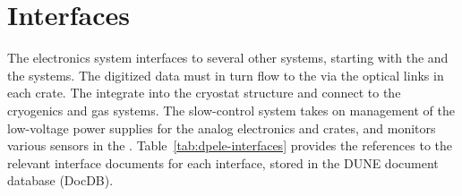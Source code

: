 

\section{Interfaces}
\label{sec:fddp-tpc-elec-intfc}


The \dual electronics system interfaces to several other systems, starting with the  and the  systems.  The digitized data must in turn %
flow to the  via the optical links in each  crate. The  integrate into the cryostat structure and connect to the cryogenics and gas systems. The slow-control system takes on management of the low-voltage power supplies for the  analog electronics and  crates, and  monitors various sensors in the . %
Table~\ref{tab:dpele-interfaces} provides the references to the relevant interface documents for each interface, stored in the DUNE document database (DocDB).

